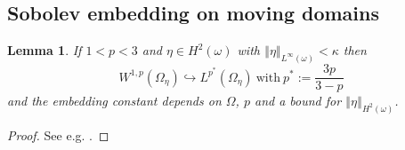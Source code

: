 \documentclass[10pt,a4paper]{article}
\newtheorem{theorem}{Theorem}[section]
\newtheorem{lemma}[theorem]{Lemma}
\numberwithin{equation}{section}
\begin{document}
\subsection{ Sobolev embedding on moving domains}
\begin{lemma}
\label{lm:Sobolev-embedding}
If $1 < p<3$ and $\eta \in H^{2}(\omega)$ with $\left\Vert \eta\right\Vert _{L^{\infty}\left(\omega\right)}<\kappa$ then \[W^{1,p}\left(\Omega_{\eta}\right)\hookrightarrow L^{p^{*}}\left(\Omega_{\eta}\right)\ \text{with} \   p^{*}:=\frac{3p}{3-p}\] and the embedding constant depends on $\Omega$, $p$ and a bound for $\left\Vert \eta\right\Vert _{H^{2}\left(\omega\right)}$.
\end{lemma}
\begin{proof}
    See e.g. \cite[Corollary 2.10]{LR14}.
\end{proof}
\end{document}
